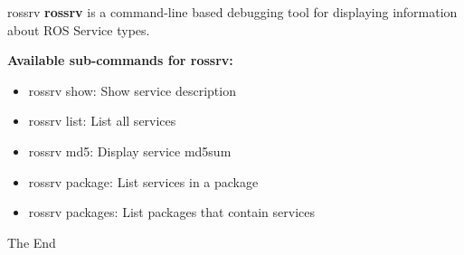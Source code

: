 \documentclass{beamer}
\begin{document}
\begin{frame}{ rossrv}
	\textbf{rossrv} is a command-line based debugging tool for displaying information about ROS Service types.
	\newline
	\newline
	\begin{large}\textbf{Available sub-commands for rossrv:}\end{large}
	\begin{itemize}
		\item rossrv show: Show service description
		\item rossrv list: List all services
		\item rossrv md5: Display service md5sum
		\item rossrv package: List services in a package
		\item rossrv packages: List packages that contain services
		
	\end{itemize}
\end{frame}
\begin{frame}
\Huge{\centerline{The End}}
\end{frame}
\end{document}
